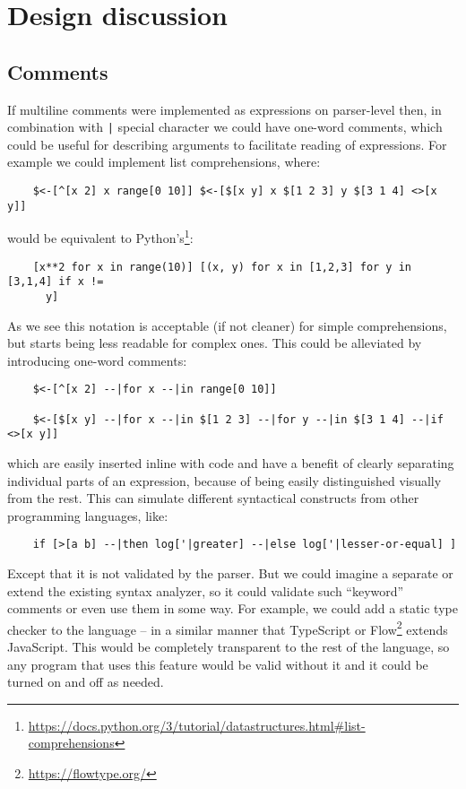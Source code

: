 \chapter{Design discussion}\label{chap:design}

\section{Comments}\label{sec:comments}
If multiline comments were implemented as expressions on parser-level then, in
combination with \texttt{|} special character we could have one-word comments,
which could be useful for describing arguments to facilitate reading of
expressions. For example we could implement list comprehensions, where:
\begin{lstlisting}
    $<-[^[x 2] x range[0 10]] $<-[$[x y] x $[1 2 3] y $[3 1 4] <>[x y]]
\end{lstlisting}
would be equivalent to
Python's\footnote{\url{https://docs.python.org/3/tutorial/datastructures.html\#list-comprehensions}}:
\begin{lstlisting}
    [x**2 for x in range(10)] [(x, y) for x in [1,2,3] for y in [3,1,4] if x !=
      y]
\end{lstlisting}
As we see this notation is acceptable (if not cleaner) for simple
comprehensions, but starts being less readable for complex ones. This could be
alleviated by introducing one-word comments:
\begin{lstlisting}
    $<-[^[x 2] --|for x --|in range[0 10]]
    
    $<-[$[x y] --|for x --|in $[1 2 3] --|for y --|in $[3 1 4] --|if <>[x y]]
\end{lstlisting}
which are easily inserted inline with code and have a benefit of clearly
separating individual parts of an expression, because of being easily
distinguished visually from the rest. This can simulate different syntactical
constructs from other programming languages, like:
\begin{lstlisting}
    if [>[a b] --|then log['|greater] --|else log['|lesser-or-equal] ]
\end{lstlisting}
Except that it is not validated by the parser. But we could imagine a separate
or extend the existing syntax analyzer, so it could validate such ``keyword''
comments or even use them in some way. For example, we could add a static type
checker to the language -- in a similar manner that TypeScript or
Flow\footnote{\url{https://flowtype.org/}} extends JavaScript. This would be
completely transparent to the rest of the language, so any program that uses
this feature would be valid without it and it could be turned on and off as
needed.

